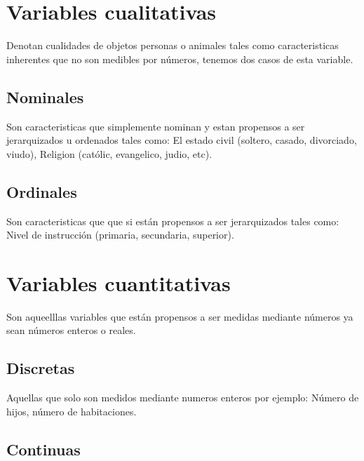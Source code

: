 \documentclass[10pt,]{krantz}
\theoremstyle{definition}
\theoremstyle{definition}
\theoremstyle{definition}
\theoremstyle{remark}
\begin{document}
\hypertarget{variables-cualitativas}{%
\section{Variables cualitativas}\label{variables-cualitativas}}

Denotan cualidades de objetos personas o animales tales como caracteristicas inherentes que no son medibles por números, tenemos dos casos de esta variable.

\hypertarget{nominales}{%
\subsection{Nominales}\label{nominales}}

Son caracteristicas que simplemente nominan y estan propensos a ser jerarquizados u ordenados tales como: El estado civil (soltero, casado, divorciado, viudo), Religion (católic, evangelico, judio, etc).

\hypertarget{ordinales}{%
\subsection{Ordinales}\label{ordinales}}

Son caracteristicas que que si están propensos a ser jerarquizados tales como: Nivel de instrucción (primaria, secundaria, superior).

\hypertarget{variables-cuantitativas}{%
\section{Variables cuantitativas}\label{variables-cuantitativas}}

Son aqueelllas variables que están propensos a ser medidas mediante números ya sean números enteros o reales.

\hypertarget{discretas}{%
\subsection{Discretas}\label{discretas}}

Aquellas que solo son medidos mediante numeros enteros por ejemplo: Número de hijos, número de habitaciones.

\hypertarget{continuas}{%
\subsection{Continuas}\label{continuas}}
\end{document}
